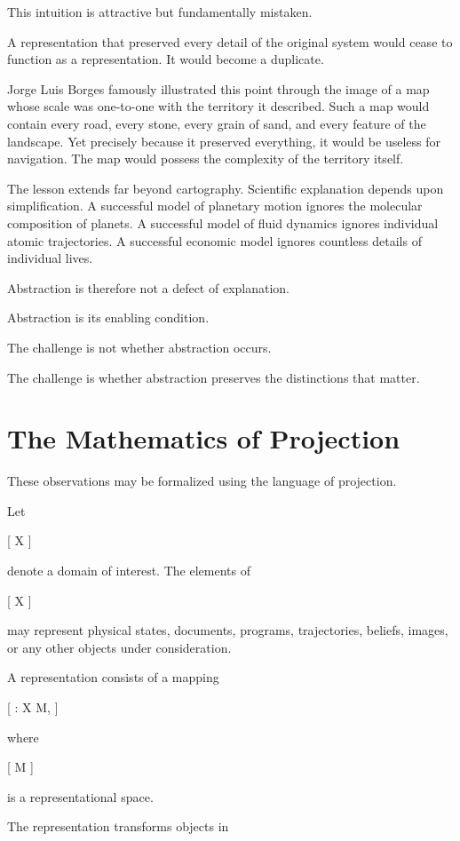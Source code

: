\documentclass[11pt,oneside,openany]{book}
\begin{document}
This intuition is attractive but fundamentally mistaken.

A representation that preserved every detail of the original system would cease to function as a representation. It would become a duplicate.

Jorge Luis Borges famously illustrated this point through the image of a map whose scale was one-to-one with the territory it described. Such a map would contain every road, every stone, every grain of sand, and every feature of the landscape. Yet precisely because it preserved everything, it would be useless for navigation. The map would possess the complexity of the territory itself.

The lesson extends far beyond cartography. Scientific explanation depends upon simplification. A successful model of planetary motion ignores the molecular composition of planets. A successful model of fluid dynamics ignores individual atomic trajectories. A successful economic model ignores countless details of individual lives.

Abstraction is therefore not a defect of explanation.

Abstraction is its enabling condition.

The challenge is not whether abstraction occurs.

The challenge is whether abstraction preserves the distinctions that matter.

\section{The Mathematics of Projection}

These observations may be formalized using the language of projection.

Let

[
\mathcal X
]

denote a domain of interest. The elements of

[
\mathcal X
]

may represent physical states, documents, programs, trajectories, beliefs, images, or any other objects under consideration.

A representation consists of a mapping

[
\pi : \mathcal X \rightarrow \mathcal M,
]

where

[
\mathcal M
]

is a representational space.

The representation transforms objects in
\end{document}
